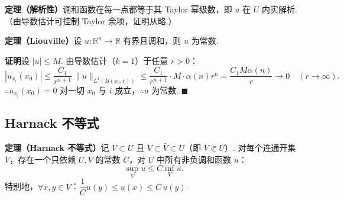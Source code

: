 \documentclass{article}
\begin{document}
\noindent\textbf{定理（解析性）}\quad 调和函数在每一点都等于其 Taylor 幂级数，即 $u$ 在 $U$ 内实解析.（由导数估计可控制 Taylor 余项，证明从略.）

\noindent\textbf{定理（Liouville）}\quad 设 $u: \mathbb{R}^n \to \mathbb{R}$ 有界且调和，则 $u$ 为常数.

\noindent\textbf{证明}\quad 设 $|u| \leq M$. 由导数估计（$k=1$）于任意 $r>0$：
\[
|u_{x_i}(x_0)| \leq \frac{C_1}{r^{n+1}}\, \|u\|_{L^1(B(x_0,r))} \leq \frac{C_1}{r^{n+1}} \cdot M \cdot \alpha(n) r^n = \frac{C_1 M \alpha(n)}{r} \to 0 \quad (r \to \infty).
\]
$\therefore u_{x_i}(x_0) = 0$ 对一切 $x_0$ 与 $i$ 成立，$\therefore u$ 为常数. $\blacksquare$

\subsection{Harnack 不等式}

\noindent\textbf{定理（Harnack 不等式）}\quad 记 $V \subset U$ 且 $V \subset \bar{V} \subset U$（即 $V \Subset U$）. 对每个连通开集 $V$，存在一个只依赖 $U,V$ 的常数 $C$，对 $U$ 中所有非负调和函数 $u$：
\[
\sup_V u \leq C \inf_V u.
\]
特别地，$\forall x, y \in V$：$\dfrac{1}{C} u(y) \leq u(x) \leq C\, u(y)$.
\end{document}
